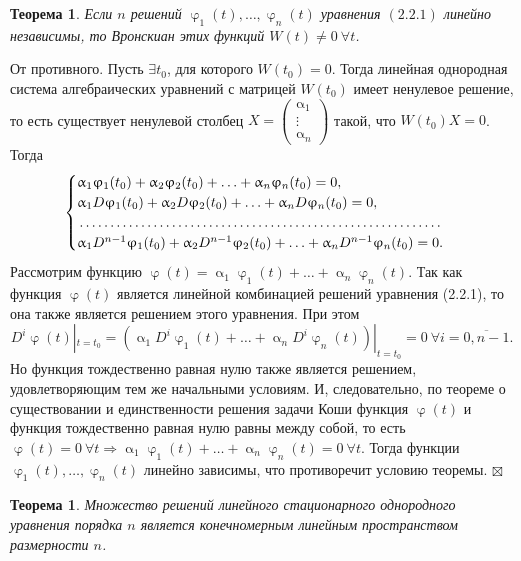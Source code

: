 \documentclass[a4paper, 12pt]{report}
\newenvironment{Proof} %
{\par\noindent{$\blacklozenge$}} %
{\hfill$\scriptstyle\boxtimes$}
\renewcommand{\alpha}{\upalpha}
\renewcommand{\varphi}{\upvarphi}
\begin{document}
	\newtheorem*{2_2_2}{Теорема} \begin{2_2_2} Если $n$ решений $\varphi_1(t), \ldots, \varphi_n(t)$ уравнения $(2.2.1)$ линейно независимы, то Вронскиан этих функций $W(t) \ne 0\ \forall t$.
	\end{2_2_2} \begin{Proof}
		От противного. Пусть $\exists t_0$, для которого $W(t_0) = 0$. Тогда линейная однородная система алгебраических уравнений с матрицей $W(t_0)$ имеет ненулевое решение, то есть существует ненулевой столбец $X = \begin{pmatrix}
			\alpha_1 \\ \vdots \\ \alpha_n
		\end{pmatrix}$ такой, что $W(t_0)X = 0$. Тогда $$\begin{cases}
			\alpha_1\varphi_1(t_0) + \alpha_2\varphi_2(t_0) + \ldots + \alpha_n\varphi_n(t_0) = 0,\\
			\alpha_1D\varphi_1(t_0) + \alpha_2D\varphi_2(t_0) + \ldots + \alpha_nD\varphi_n(t_0) = 0,\\
			\dotfill\\
			\alpha_1D^{n-1}\varphi_1(t_0) + \alpha_2D^{n-1}\varphi_2(t_0) + \ldots + \alpha_nD^{n-1}\varphi_n(t_0) = 0.
		\end{cases}$$ Рассмотрим функцию $\varphi(t) = \alpha_1\varphi_1(t) + \ldots + \alpha_n\varphi_n(t)$. Так как функция $\varphi(t)$ является линейной комбинацией решений уравнения (2.2.1), то она также является решением этого уравнения. При этом $$D^i\varphi(t)|_{t=t_0} = (\alpha_1D^i\varphi_1(t) + \ldots + \alpha_nD^i\varphi_n(t))|_{t=t_0} = 0\ \forall i = \overline{0, n-1}.$$
		Но функция тождественно равная нулю также является решением, удовлетворяющим тем же начальными условиям. И, следовательно, по теореме о существовании и единственности решения задачи Коши функция $\varphi(t)$ и функция тождественно равная нулю равны между собой, то есть $\varphi(t) = 0\ \forall t \Rightarrow \alpha_1\varphi_1(t) + \ldots + \alpha_n\varphi_n(t) = 0\ \forall t$. Тогда функции $\varphi_1(t),\ldots,\varphi_n(t)$ линейно зависимы, что противоречит условию теоремы.
	\end{Proof}
	\newtheorem*{2_2_3}{Теорема}\begin{2_2_3}
		Множество решений линейного стационарного однородного уравнения порядка $n$ является конечномерным линейным пространством размерности $n$.
	\end{2_2_3}
\end{document}

